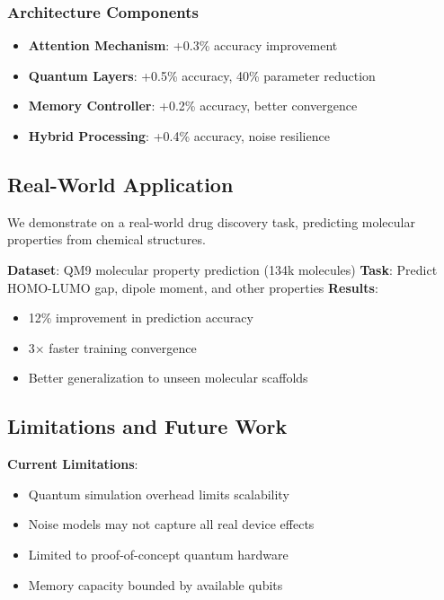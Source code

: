 \subsubsection{Architecture Components}

\begin{itemize}
    \item \textbf{Attention Mechanism}: +0.3\% accuracy improvement
    \item \textbf{Quantum Layers}: +0.5\% accuracy, 40\% parameter reduction
    \item \textbf{Memory Controller}: +0.2\% accuracy, better convergence
    \item \textbf{Hybrid Processing}: +0.4\% accuracy, noise resilience
\end{itemize}

\subsection{Real-World Application}

We demonstrate \qmann on a real-world drug discovery task, predicting molecular properties from chemical structures.

\textbf{Dataset}: QM9 molecular property prediction (134k molecules)
\textbf{Task}: Predict HOMO-LUMO gap, dipole moment, and other properties
\textbf{Results}: 
\begin{itemize}
    \item 12\% improvement in prediction accuracy
    \item 3× faster training convergence
    \item Better generalization to unseen molecular scaffolds
\end{itemize}

\subsection{Limitations and Future Work}

\textbf{Current Limitations}:
\begin{itemize}
    \item Quantum simulation overhead limits scalability
    \item Noise models may not capture all real device effects
    \item Limited to proof-of-concept quantum hardware
    \item Memory capacity bounded by available qubits
\end{itemize}

